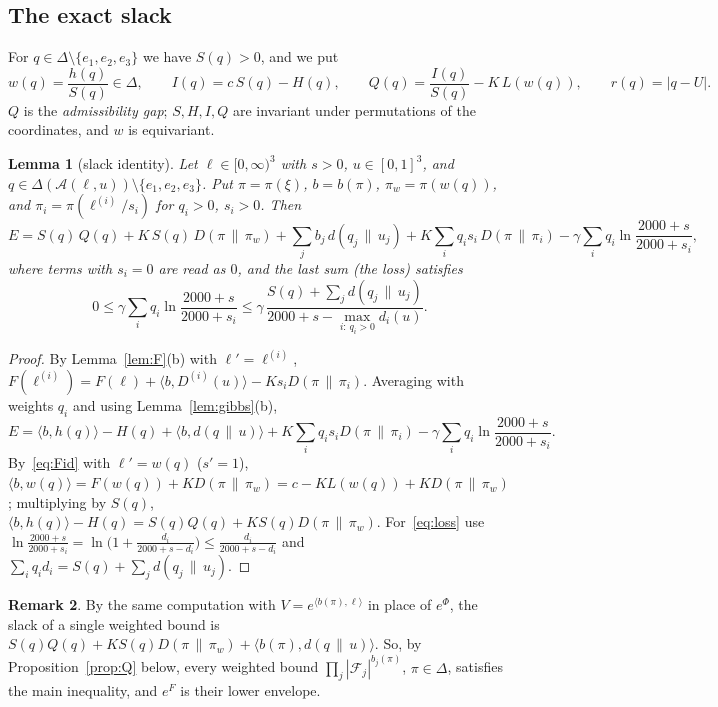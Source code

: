 \documentclass[11pt]{article}
\newtheorem{lemma}{Lemma}[section]
\theoremstyle{definition}
\newtheorem{remark}[lemma]{Remark}
\numberwithin{equation}{section}
\newcommand{\ip}[2]{\langle #1,#2\rangle}
\newcommand{\KLb}[2]{d(#1\,\|\,#2)}
\newcommand{\KL}[2]{D(#1\,\|\,#2)}
\newcommand{\Azero}{2000}
\newcommand{\cA}{\mathcal A}
\newcommand{\cF}{\mathcal F}
\begin{document}
\subsection{The exact slack}

For $q\in\Delta\setminus\{e_1,e_2,e_3\}$ we have $S(q)>0$, and we put
\[
w(q)=\frac{h(q)}{S(q)}\in\Delta,\qquad I(q)=c\,S(q)-H(q),\qquad Q(q)=\frac{I(q)}{S(q)}-K\,L(w(q)),\qquad r(q)=|q-U| .
\]
$Q$ is the \emph{admissibility gap}; $S,H,I,Q$ are invariant under permutations of the coordinates, and $w$ is equivariant.

\begin{lemma}[slack identity]\label{lem:slack}
Let $\ell\in[0,\infty)^3$ with $s>0$, $u\in[0,1]^3$, and $q\in\Delta(\cA(\ell,u))\setminus\{e_1,e_2,e_3\}$. Put $\pi=\pi(\xi)$,
$b=b(\pi)$, $\pi_w=\pi(w(q))$, and $\pi_i=\pi(\ell^{(i)}/s_i)$ for $q_i>0$, $s_i>0$. Then
\begin{equation}\label{eq:slack}
E=S(q)\,Q(q)+K\,S(q)\,\KL\pi{\pi_w}+\sum_jb_j\,\KLb{q_j}{u_j}+K\sum_iq_is_i\,\KL\pi{\pi_i}-\gamma\sum_iq_i\ln\frac{\Azero+s}{\Azero+s_i},
\end{equation}
where terms with $s_i=0$ are read as $0$, and the last sum (the \emph{loss}) satisfies
\begin{equation}\label{eq:loss}
0\le\gamma\sum_iq_i\ln\frac{\Azero+s}{\Azero+s_i}\le\gamma\,\frac{S(q)+\sum_j\KLb{q_j}{u_j}}{\Azero+s-\max_{i:\,q_i>0}d_i(u)} .
\end{equation}
\end{lemma}
\begin{proof}
By Lemma~\ref{lem:F}(b) with $\ell'=\ell^{(i)}$, $F(\ell^{(i)})=F(\ell)+\ip b{D^{(i)}(u)}-Ks_i\KL\pi{\pi_i}$. Averaging with weights
$q_i$ and using Lemma~\ref{lem:gibbs}(b),
\[
E=\ip b{h(q)}-H(q)+\ip b{\KLb qu}+K\sum_iq_is_i\KL\pi{\pi_i}-\gamma\sum_iq_i\ln\frac{\Azero+s}{\Azero+s_i}.
\]
By~\eqref{eq:Fid} with $\ell'=w(q)$ ($s'=1$), $\ip b{w(q)}=F(w(q))+K\KL\pi{\pi_w}=c-KL(w(q))+K\KL\pi{\pi_w}$; multiplying by $S(q)$,
$\ip b{h(q)}-H(q)=S(q)Q(q)+KS(q)\KL\pi{\pi_w}$. For~\eqref{eq:loss} use $\ln\frac{\Azero+s}{\Azero+s_i}=\ln\bigl(1+\frac{d_i}{\Azero+s-d_i}\bigr)\le
\frac{d_i}{\Azero+s-d_i}$ and $\sum_iq_id_i=S(q)+\sum_j\KLb{q_j}{u_j}$.
\end{proof}

\begin{remark}\label{rem:envelope}
By the same computation with $V=e^{\ip{b(\pi)}{\ell}}$ in place of $e^\Phi$, the slack of a single weighted bound is
$S(q)Q(q)+KS(q)\KL\pi{\pi_w}+\ip{b(\pi)}{\KLb qu}$. So, by Proposition~\ref{prop:Q} below, every weighted bound
$\prod_j|\cF_j|^{b_j(\pi)}$, $\pi\in\Delta$, satisfies the main inequality, and $e^F$ is their lower envelope.
\end{remark}
\end{document}
